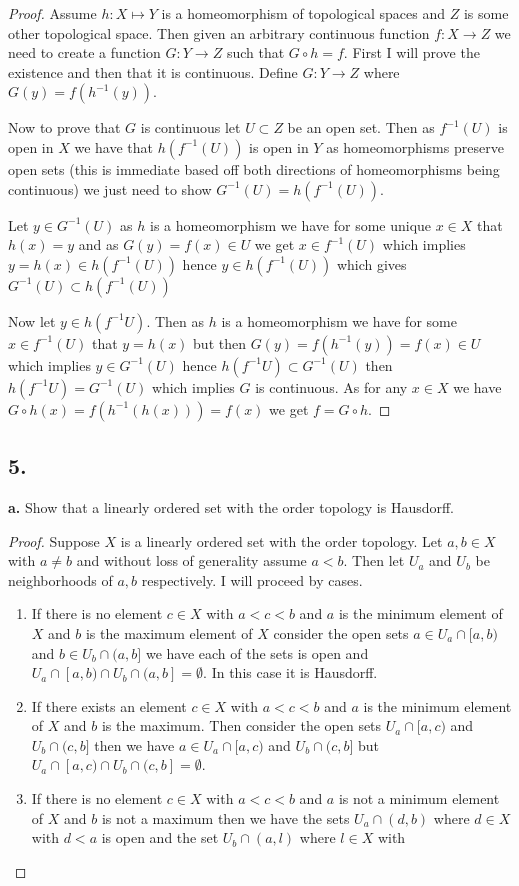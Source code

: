 \documentclass{amsart}
\theoremstyle{plain}
\theoremstyle{definition}
\theoremstyle{remark}
\begin{document}
\begin{proof}
  Assume $h:X\mapsto Y$ is a homeomorphism of topological spaces and $Z$ is some other topological space. Then given an arbitrary continuous function $f:X\to Z$ we need to create a function $G: Y\to Z$ such that $G\circ h=f$. First I will prove the existence and then that it is continuous. Define $G: Y \to Z$ where $G(y)=f(h^{-1}(y))$.
  
  Now to prove that $G$ is continuous let $U\subset Z$ be an open set. Then as $f^{-1}(U)$ is open in $X$ we have that $h(f^{-1}(U))$ is open in $Y$ as homeomorphisms preserve open sets (this is immediate based off both directions of homeomorphisms being continuous) we just need to show $G^{-1}(U)=h(f^{-1}(U))$. 
  
  Let $y\in G^{-1}(U)$ as $h$ is a homeomorphism we have for some unique $x\in X$ that $h(x)= y $  and as $G(y)=f(x)\in U$ we get $x\in f^{-1}(U)$ which implies $y=h(x)\in h(f^{-1}(U))$ hence $y\in h(f^{-1}(U))$ which gives $G^{-1}(U)\subset h(f^{-1}(U))$ 

  Now let $y\in h(f^{-1}U)$. Then as $h$ is a homeomorphism we have for some $x\in f^{-1}(U)$ that $y=h(x)$ but then $G(y)=f(h^{-1}(y))=f(x)\in U$ which implies $y\in G^{-1}(U)$ hence $h(f^{-1}U)\subset G^{-1}(U)$ then $h(f^{-1}U)=G^{-1}(U)$ which implies $G$ is continuous. As for any $x\in X$ we have $G\circ h (x)=f(h^{-1}(h(x)))=f(x)$ we get $f=G\circ h$. 
\end{proof}

\noindent
\subsection*{5.}

{\bf a.} Show that a linearly ordered set with the order topology is Hausdorff. 


\begin{proof}
    Suppose $X$ is a linearly ordered set with the order topology. Let $a,b\in X$ with $a\not = b$ and without loss of generality assume $a<b$. Then let $U_a$ and $U_b$ be neighborhoods of $a,b$ respectively. I will proceed by cases. 
    \begin{enumerate}
        \item If there is no element $c\in X$ with $a<c<b$ and $a$ is the minimum element of $X$ and $b$ is the maximum element of $X$ consider the open sets $a\in U_a\cap [a,b)$ and $b\in U_b\cap (a,b]$ we have each of the sets is open and $U_a\cap [a,b)\cap U_b\cap (a,b]=\emptyset$. In this case it is Hausdorff.
        \item If there exists an element $c\in X$ with $a<c<b$ and $a$ is the minimum element of $X$ and $b$ is the maximum. Then consider the open sets $U_a\cap [a,c)$ and $U_b\cap (c,b]$ then we have $a\in U_a\cap [a,c)$ and $U_b\cap (c,b]$ but $U_a \cap[a,c) \cap U_b\cap (c,b]=\emptyset$.
        \item If there is no element $c\in X$ with $a<c<b$ and $a$ is not a minimum element of $X$ and $b$ is not a maximum then we have the sets $U_a\cap (d,b)$ where $d\in X$ with $d<a$ is open and the set $U_b\cap (a,l)$ where $l\in X$ with 
    \end{enumerate} 
\end{proof}
\end{document}
